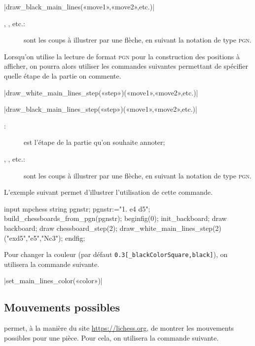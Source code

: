 \documentclass[french]{ltxdoc}
\begin{document}
\commande|draw_black_main_lines(«move1»,«move2»,etc.)|\smallskip

\begin{description}
\item[, , etc.:] sont les coups à illustrer par une
flèche, en suivant la notation de type \textsc{pgn}.
\end{description}
Lorsqu’on utilise la lecture de format \textsc{pgn} pour la construction des
positions à afficher, on pourra alors utiliser les commandes suivantes
permettant de spécifier quelle étape de la partie on commente. 

\commande|draw_white_main_lines_step(«step»)(«move1»,«move2»,etc.)|\smallskip

\commande|draw_black_main_lines_step(«step»)(«move1»,«move2»,etc.)|\smallskip

\begin{description}
  \item[:] est l’étape de la partie qu’on souhaite annoter; 
\item[, , etc.:] sont les coups à illustrer par une
flèche, en suivant la notation de type \textsc{pgn}.
\end{description}

L’exemple suivant permet d’illustrer l’utilisation de cette commande. 

\begin{ExempleMP}
input mpchess
string pgnstr;
pgnstr:="1. e4 d5";
build_chessboards_from_pgn(pgnstr);
beginfig(0);
init_backboard;
draw backboard;
draw chessboard_step(2);
draw_white_main_lines_step(2)("exd5","e5","Nc3");
endfig;
\end{ExempleMP}

Pour changer la couleur (par défaut \lstinline+0.3[_blackColorSquare,black]+),
on utilisera la commande suivante. 

\commande|set_main_lines_color(«color»)|\smallskip

\subsection{Mouvements possibles}\label{sec:possiblemoves}

\mpchess permet, à la manière du site \href{Lichess.org}{https://lichess.org},
de montrer les mouvements possibles pour une pièce. Pour cela, on utilisera la
commande suivante.
\end{document}

